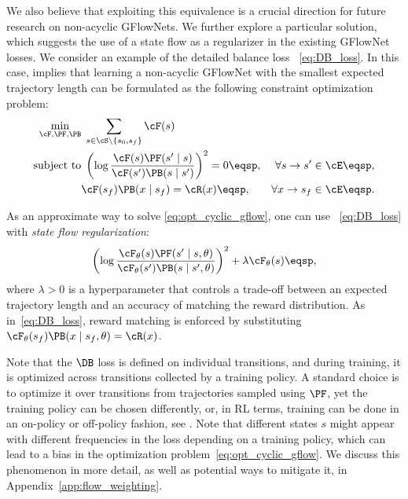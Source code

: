 We also believe that exploiting this equivalence is a crucial direction for future research on non-acyclic GFlowNets. We further explore a particular solution, which suggests the use of a state flow as a regularizer in the existing GFlowNet losses. We consider an example of the detailed balance loss \DB~\eqref{eq:DB_loss}. In this case,  implies that learning a non-acyclic GFlowNet with the smallest expected trajectory length can be formulated as the following constraint optimization problem:
\begin{align}
\label{eq:opt_cyclic_gflow}
\min\limits_{\cF, \PF, \PB} &\; \sum\limits_{s \in \cS \setminus \{s_0, s_f\}} \cF(s) \\
\text{subject to}&\; \left( \log\frac{\cF(s)\PF(s' \mid s)}{\cF(s')\PB(s \mid s')}\right)^2 = 0\eqsp, & \forall s \to s' \in \cE \eqsp, \notag \\
& \cF(s_f) \PB(x \mid s_f) = \cR(x)\eqsp,&  \forall x \to s_f \in \cE\eqsp.\notag
\end{align}


As an approximate way to solve \eqref{eq:opt_cyclic_gflow}, one can use \DB~\eqref{eq:DB_loss} with \textit{state flow regularization}:
\begin{equation}
\label{eq:RDB_loss}
\left(\log \frac{\cF_{\theta}(s) \PF(s' \mid s, \theta)}{\cF_{\theta}(s')\PB(s \mid s', \theta)} \right)^2 + \lambda \cF_\theta(s) \eqsp,
\end{equation}
where $\lambda > 0$ is a hyperparameter that controls a trade-off between an expected trajectory length and an accuracy of matching the reward distribution. As in~\eqref{eq:DB_loss}, reward matching is enforced by substituting $\cF_{\theta}(s_f)\PB(x  \mid s_f, \theta) = \cR(x)$.

Note that the $\DB$ loss is defined on individual transitions, and during training, it is optimized across transitions collected by a training policy. A standard choice is to optimize it over transitions from trajectories sampled using $\PF$, yet the training policy can be chosen differently, %
or, in RL terms, training can be done in an on-policy or off-policy fashion, see \cite{tiapkin2024generative}. Note that different states $s$ might appear with different frequencies in the loss depending on a training policy, which can lead to
a bias in the optimization problem~\eqref{eq:opt_cyclic_gflow}. We discuss this phenomenon in more detail, as well as potential ways to mitigate it, in Appendix~\ref{app:flow_weighting}.

